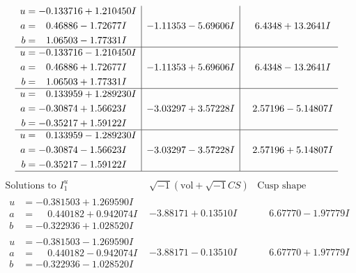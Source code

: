 \documentclass[1p]{elsarticle_modified}
\theoremstyle{definition}
\newcommand{\I}{\sqrt{-1}}
\begin{document}
$$\begin{array}{c|c|c}
\begin{aligned}
u &= -0.133716 + 1.210450 I \\
a &= \phantom{-}0.46886 - 1.72677 I \\
b &= \phantom{-}1.06503 - 1.77331 I\end{aligned}
 & -1.11353 - 5.69606 I & \phantom{-}6.4348 + 13.2641 I \\ \hline\begin{aligned}
u &= -0.133716 - 1.210450 I \\
a &= \phantom{-}0.46886 + 1.72677 I \\
b &= \phantom{-}1.06503 + 1.77331 I\end{aligned}
 & -1.11353 + 5.69606 I & \phantom{-}6.4348 - 13.2641 I \\ \hline\begin{aligned}
u &= \phantom{-}0.133959 + 1.289230 I \\
a &= -0.30874 + 1.56623 I \\
b &= -0.35217 + 1.59122 I\end{aligned}
 & -3.03297 + 3.57228 I & \phantom{-}2.57196 - 5.14807 I \\ \hline\begin{aligned}
u &= \phantom{-}0.133959 - 1.289230 I \\
a &= -0.30874 - 1.56623 I \\
b &= -0.35217 - 1.59122 I\end{aligned}
 & -3.03297 - 3.57228 I & \phantom{-}2.57196 + 5.14807 I\\
 \hline 
 \end{array}$$\newpage$$\begin{array}{c|c|c}  
\text{Solutions to }I^u_{1}& \I (\text{vol} + \sqrt{-1}CS) & \text{Cusp shape}\\
 \hline 
\begin{aligned}
u &= -0.381503 + 1.269590 I \\
a &= \phantom{-}0.440182 + 0.942074 I \\
b &= -0.322936 + 1.028520 I\end{aligned}
 & -3.88171 + 0.13510 I & \phantom{-}6.67770 - 1.97779 I \\ \hline\begin{aligned}
u &= -0.381503 - 1.269590 I \\
a &= \phantom{-}0.440182 - 0.942074 I \\
b &= -0.322936 - 1.028520 I\end{aligned}
 & -3.88171 - 0.13510 I & \phantom{-}6.67770 + 1.97779 I \\ \hline\begin{aligned}

\end{aligned}
\end{array}$$
\end{document}
